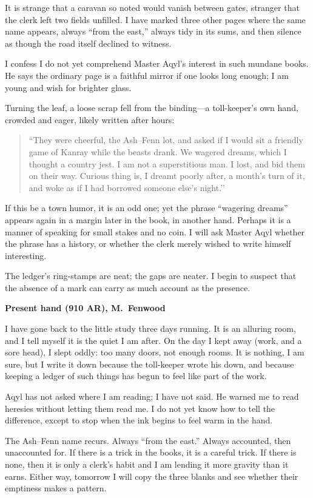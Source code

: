 \documentclass[11pt]{article}
\begin{document}
It is strange that a caravan so noted would vanish between gates, stranger that the clerk left two fields unfilled. I have marked three other pages where the same name appears, always ``from the east,'' always tidy in its sums, and then silence as though the road itself declined to witness.

I confess I do not yet comprehend Master Aqyl’s interest in such mundane books. He says the ordinary page is a faithful mirror if one looks long enough; I am young and wish for brighter glass.

Turning the leaf, a loose scrap fell from the binding---a toll-keeper’s own hand, crowded and eager, likely written after hours:

\begin{quote}
\small
``They were cheerful, the Ash--Fenn lot, and asked if I would sit a friendly game of Kanray while the beasts drank. We wagered dreams, which I thought a country jest. I am not a superstitious man. I lost, and bid them on their way. Curious thing is, I dreamt poorly after, a month’s turn of it, and woke as if I had borrowed someone else’s night.’’
\end{quote}

If this be a town humor, it is an odd one; yet the phrase ``wagering dreams'' appears again in a margin later in the book, in another hand. Perhaps it is a manner of speaking for small stakes and no coin. I will ask Master Aqyl whether the phrase has a history, or whether the clerk merely wished to write himself interesting.

The ledger’s ring-stamps are neat; the gaps are neater. I begin to suspect that the absence of a mark can carry as much account as the presence.

\medskip
\noindent\textbf{Present hand (910 AR), M.\ Fenwood}

I have gone back to the little study three days running. It is an alluring room, and I tell myself it is the quiet I am after. On the day I kept away (work, and a sore head), I slept oddly: too many doors, not enough rooms. It is nothing, I am sure, but I write it down because the toll-keeper wrote his down, and because keeping a ledger of such things has begun to feel like part of the work.

Aqyl has not asked where I am reading; I have not said. He warned me to read heresies without letting them read me. I do not yet know how to tell the difference, except to stop when the ink begins to feel warm in the hand.

The Ash--Fenn name recurs. Always ``from the east.'' Always accounted, then unaccounted for. If there is a trick in the books, it is a careful trick. If there is none, then it is only a clerk’s habit and I am lending it more gravity than it earns. Either way, tomorrow I will copy the three blanks and see whether their emptiness makes a pattern.
\end{document}

